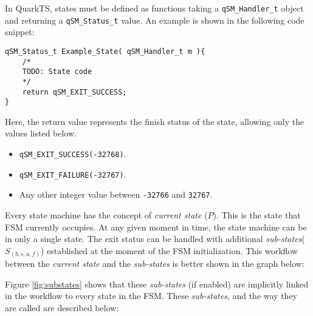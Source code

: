 In QuarkTS, states must be defined as functions taking a \lstinline{qSM_Handler_t} object and returning a \lstinline{qSM_Status_t} value. An example is shown in the following code snippet:
\newline

\begin{lstlisting}[style=CStyle]
qSM_Status_t Example_State( qSM_Handler_t m ){
    /*
    TODO: State code
    */
    return qSM_EXIT_SUCCESS;
}
\end{lstlisting}    

Here, the return value represents the finish status of the state, allowing only the values listed below.

\begin{itemize}
    \item \lstinline{qSM_EXIT_SUCCESS(-32768)}.
    \item \lstinline{qSM_EXIT_FAILURE(-32767)}.
    \item Any other integer value between \lstinline{-32766} and \lstinline{32767}.
\end{itemize} 

Every state machine has the concept of \textit{current state} ($P$). This is the state that FSM currently occupies. At any given moment in time, the state machine can be in only a single state. The exit status can be handled with additional \textit{sub-states}($S_{(b,s,u,f)}$) established at the moment of the FSM initialization. This workflow between the \textit{current state} and the \textit{sub-states} is better shown in the graph below: 



Figure \ref{fig:substates} shows that these \textit{sub-states} (if enabled) are implicitly linked in the workflow to every state in the FSM. These \textit{sub-states}, and the way they are called are described below:

